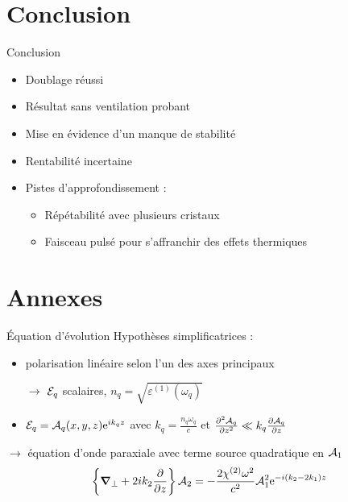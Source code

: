 \documentclass{beamer}
\begin{document}
\section{Conclusion}

\begin{frame}{Conclusion}
\begin{itemize}[<+->]
\item Doublage réussi
\item Résultat sans ventilation probant
\item Mise en évidence d'un manque de stabilité
\item Rentabilité incertaine
\item Pistes d'approfondissement :
\begin{itemize}
\item Répétabilité avec plusieurs cristaux
\item Faisceau pulsé pour s'affranchir des effets thermiques
\end{itemize}
\end{itemize}
\end{frame}

\appendix

\section{Annexes}

\begin{frame}{Équation d'évolution}
Hypothèses simplificatrices :
\begin{itemize}
\item polarisation linéaire selon l'un des axes principaux
\item[$\rightarrow$] $\mathcal{E}_q$ scalaires, $n_q = \sqrt{ \varepsilon^{(1)}(\omega_q)}$
\item $\mathcal{E}_q = \mathcal{A}_q(x,y,z) \text{e}^{ik_qz}$ avec $k_q =\frac{n_q \omega_q}{c}$ et $\frac{\partial^2 \mathcal{A}_q}{\partial z^2} \ll k_q \frac{\partial \mathcal{A}_q}{\partial z}$
\end{itemize}
$\boldsymbol \rightarrow$ équation d'onde paraxiale avec terme source quadratique en $\mathcal{A}_1$
\begin{equation*}
\left\{\boldsymbol{\mathbf{\nabla}}_\bot + 2 i k_2 \frac{\partial}{\partial z} \right\} \mathcal{A}_2 = - \frac{2 \chi^{(2)} \omega^2}{c^2} \mathcal{A}_1^2 \text{e}^{- i (k_2 - 2k_1) z}
\end{equation*}
\end{frame}
\end{document}
